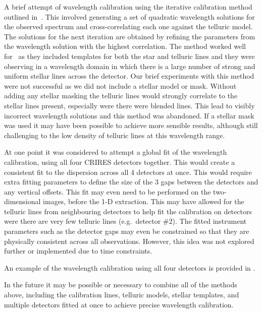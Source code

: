 A brief attempt of wavelength calibration using the iterative calibration method outlined in~\cite{brogi_rotation_2016}.
This involved generating a set of quadratic wavelength solutions for the observed spectrum and cross-correlating each one against the telluric model.
The solutions for the next iteration are obtained by refining the parameters from the wavelength solution with the highest correlation.
The method worked well for~\citet{brogi_rotation_2016} as they included templates for both the star and telluric lines and they were observing in a wavelength domain in which there is a large number of strong and uniform stellar  lines across the detector.
Our brief experiments with this method were not successful as we did not include a stellar model or mask.
Without adding any stellar masking the telluric lines would strongly correlate to the stellar lines present, especially were there were blended lines.
This lead to visibly incorrect wavelength solutions and this method was abandoned.
If a stellar mask was used it may have been possible to achieve more sensible results, although still challenging to the low density of telluric lines at this wavelength range.


At one point it was considered to attempt a global fit of the wavelength calibration, using all four {CRIRES} detectors together.
This would create a consistent fit to the dispersion across all 4 detectors at once.
This would require extra fitting parameters to define the size of the 3 gaps between the detectors and any vertical offsets.
This fit may even need to be performed on the two-dimensional images, before the 1-D extraction.
This may have allowed for the telluric lines from neighbouring detectors to help fit the calibration on detectors were there are very few telluric lines (e.g.\ detector \#2).
The fitted instrument parameters such as the detector gaps may even be constrained so that they are physically consistent across all observations.
However, this idea was not explored further or implemented due to time constraints.


An example of the wavelength calibration using all four detectors is provided in .

In the future it may be possible or necessary to combine all of the methods above, including the \thar{} calibration lines, telluric models, stellar templates, and multiple detectors fitted at once to achieve precise wavelength calibration.

